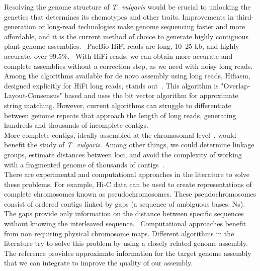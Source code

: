 Resolving the genome structure of \textit{T. vulgaris} would be crucial to unlocking the genetics that determines its chemotypes and other traits.  Improvements in third-generation or long-read technologies make genome sequencing faster and more affordable, and it is the current method of choice to generate highly contiguous plant genome assemblies.~\cite{puckerPlantGenomeSequence2022} PacBio HiFi reads are long, 10–25 kb, and highly accurate, over 99.5\%.~\cite{honHighlyAccurateLongread2020} With HiFi reads, we can obtain more accurate and complete assemblies without a correction step, as we need with noisy long reads.~\cite{puckerPlantGenomeSequence2022}\\

Among the algorithms available for de novo assembly using long reads, Hifiasm, designed explicitly for HiFi long reads, stands out~\cite{chengHaplotyperesolvedNovoAssembly2021}. This algorithm is "Overlap-Layout-Consensus" based and uses the bit vector algorithm for approximate string matching. However, current algorithms can struggle to differentiate between genome repeats that approach the length of long reads, generating hundreds and thousands of incomplete contigs.~\cite{huangAlignGraph2SimilarGenomeassisted2021} \\

More complete contigs, ideally assembled at the chromosomal level~\cite{AssemblyTerminologyGenome}, would benefit the study of \textit{T. vulgaris}. Among other things, we could determine linkage groups, estimate distances between loci, and avoid the complexity of working with a fragmented genome of thousands of contigs~\cite{tamazianChromosomerReferencebasedGenome2016}.\\

There are experimental and computational approaches in the literature to solve these problems. For example, Hi-C data can be used to create representations of complete chromosomes known as pseudochromosomes. These pseudochromosomes consist of ordered contigs linked by gaps (a sequence of ambiguous bases, Ns). The gaps provide only information on the distance between specific sequences without knowing the interleaved sequence.~\cite{puckerPlantGenomeSequence2022} Computational approaches benefit from non requiring physical chromosome maps. Different algorithms in the literature try to solve this problem by using a closely related genome assembly. The reference provides approximate information for the target genome assembly that we can integrate to improve the quality of our assembly.~\cite{huangAlignGraph2SimilarGenomeassisted2021} \\


